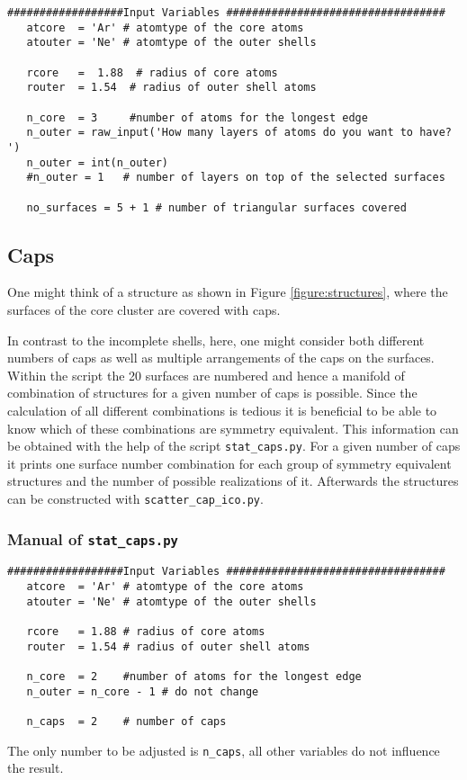 \begin{lstlisting}
##################Input Variables ##################################
   atcore  = 'Ar' # atomtype of the core atoms
   atouter = 'Ne' # atomtype of the outer shells
   
   rcore   =  1.88  # radius of core atoms
   router  = 1.54  # radius of outer shell atoms
   
   n_core  = 3     #number of atoms for the longest edge
   n_outer = raw_input('How many layers of atoms do you want to have? ')
   n_outer = int(n_outer)
   #n_outer = 1   # number of layers on top of the selected surfaces
   
   no_surfaces = 5 + 1 # number of triangular surfaces covered
\end{lstlisting}


\subsection{Caps}
One might think of a structure as shown in Figure \ref{figure:structures},
where the surfaces of the core cluster are covered with caps.

In contrast to the incomplete shells, here, one might consider both different
numbers of caps as well as multiple arrangements of the caps on the surfaces.
Within the script the 20 surfaces are numbered and hence a manifold of
combination of structures for a given number of caps is possible.
Since the calculation of all different combinations is tedious
it is beneficial to be able to know which of these combinations are symmetry
equivalent. This information can be obtained with the help of the script
\verb|stat_caps.py|. For a given number of caps it prints one surface number
combination for each group of
symmetry equivalent structures
and the number of possible realizations of it. Afterwards the structures
can be constructed with \verb|scatter_cap_ico.py|.

\subsubsection{Manual of \lstinline|stat_caps.py|}
\begin{lstlisting}
##################Input Variables ##################################
   atcore  = 'Ar' # atomtype of the core atoms
   atouter = 'Ne' # atomtype of the outer shells
   
   rcore   = 1.88 # radius of core atoms
   router  = 1.54 # radius of outer shell atoms
   
   n_core  = 2    #number of atoms for the longest edge
   n_outer = n_core - 1 # do not change
   
   n_caps  = 2    # number of caps
\end{lstlisting}
The only number to be adjusted is \verb|n_caps|, all other variables
do not influence the result.



